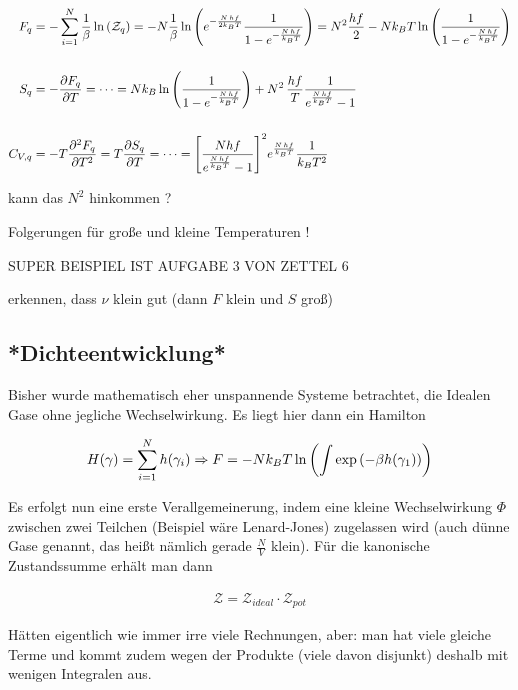 \begin{itemize}
\begin{align*}
F_q &= -\sum\limits_{i=1}^N \frac{1}{\beta} \ln\qty(\mathcal{Z}_q) = -N \frac{1}{\beta} \ln\qty(e^{-\frac{N \, h f}{2 k_B T}} \frac{1}{1-e^{-\frac{N \, h f}{k_B T}}}) = N^2 \frac{h f}{2} - N k_B T \ln\qty(\frac{1}{1-e^{-\frac{N \, h f}{k_B T}}})
\\\\
S_q &= -\pdv{F_q}{T} = \dots = N k_B \ln\qty(\frac{1}{1-e^{-\frac{N \, h f}{k_B T}}}) + N^2 \, \frac{h f}{T} \frac{1}{e^{\frac{N \, h f}{k_B T}}-1} 
\\\\
C_{V, q} &= -T \pdv[2]{F_q}{T} = T \pdv{S_q}{T} = \dots = \qty[\frac{N h f}{e^{\frac{N \, h f}{k_B T}}-1}]^2 e^{\frac{N \, h f}{k_B T}} \frac{1}{k_B T^2}
\end{align*}

kann das $N^2$ hinkommen ?

\end{itemize}

Folgerungen für große und kleine Temperaturen !


SUPER BEISPIEL IST AUFGABE 3 VON ZETTEL 6

erkennen, dass $\nu$ klein gut (dann $F$ klein und $S$ groß)



	\subsection{*Dichteentwicklung*}
Bisher wurde mathematisch eher unspannende Systeme betrachtet, die Idealen Gase ohne jegliche Wechselwirkung. Es liegt hier dann ein Hamilton

\begin{equation}\label{key}
H\qty(\gamma) = \sum\limits^N_{i=1} h\qty(\gamma_i) \Rightarrow F = -N k_B T \ln\qty(\int \exp\qty(-\beta h(\gamma_1)))
\end{equation}

Es erfolgt nun eine erste Verallgemeinerung, indem eine kleine Wechselwirkung $\Phi$ zwischen zwei Teilchen (Beispiel wäre Lenard-Jones) zugelassen wird (auch dünne Gase genannt, das heißt nämlich gerade $\frac{N}{V}$ klein). Für die kanonische Zustandssumme erhält man dann

\begin{align}\label{key}
\mathcal{Z} = \mathcal{Z}_{ideal} \cdot \mathcal{Z}_{pot}
\end{align}

Hätten eigentlich wie immer irre viele Rechnungen, aber: man hat viele gleiche Terme und kommt zudem wegen der Produkte (viele davon disjunkt) deshalb mit wenigen Integralen aus.

